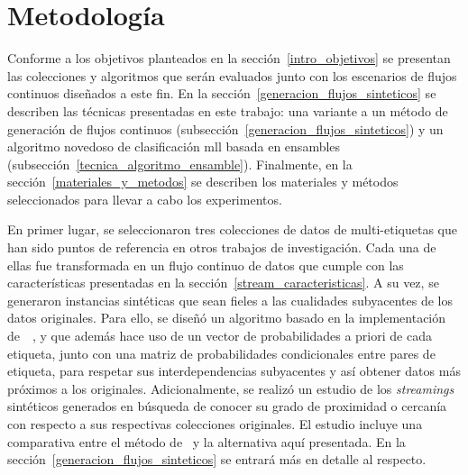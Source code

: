 \chapter{Metodología}
\label{chapter:metodologia}

Conforme a los objetivos planteados en la sección~\ref{intro_objetivos} se
presentan las colecciones y algoritmos que serán evaluados junto con los
escenarios de flujos continuos diseñados a este fin. En la
sección~\ref{generacion_flujos_sinteticos} se describen las técnicas presentadas
en este trabajo: una variante a un método de generación de flujos continuos
(subsección~\ref{generacion_flujos_sinteticos}) y un algoritmo novedoso de
clasificación \acrshort{mll} basada en ensambles
(subsección~\ref{tecnica_algoritmo_ensamble}). Finalmente, en la
sección~\ref{materiales_y_metodos} se describen los materiales y métodos
seleccionados para llevar a cabo los experimentos.

En primer lugar, se seleccionaron tres colecciones de datos de multi-etiquetas
que han sido puntos de referencia en otros trabajos de investigación. Cada una
de ellas fue transformada en un flujo continuo de datos que cumple con las
características presentadas en la sección~\ref{stream_caracteristicas}. A su
vez, se generaron instancias sintéticas que sean fieles a las cualidades
subyacentes de los datos originales.  Para ello, se diseñó un algoritmo basado
en la implementación
de~\citeauthor{read_multi-label_2008}~\cite{read_multi-label_2008}, y que además
hace uso de un vector de probabilidades a priori de cada etiqueta, junto con una
matriz de probabilidades condicionales entre pares de etiqueta, para respetar
sus interdependencias subyacentes y así obtener datos más próximos a los
originales. Adicionalmente, se realizó un estudio de los \textit{streamings}
sintéticos generados en búsqueda de conocer su grado de proximidad o cercanía
con respecto a sus respectivas colecciones originales. El estudio incluye una
comparativa entre el método de~\citeauthor{read_multi-label_2008} y la
alternativa aquí presentada. En la sección~\ref{generacion_flujos_sinteticos} se
entrará más en detalle al respecto.

